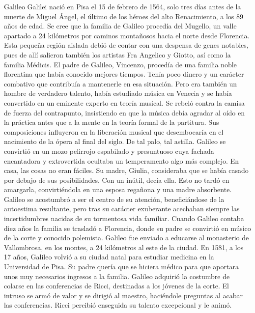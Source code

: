 \documentclass[letterpaper, 10pt, journal]{IEEEtran}
\begin{document}
Galileo Galilei nació en Pisa el 15 de febrero de 1564, solo tres días antes de la muerte de Miguel Ángel, el último de los héroes del alto Renacimiento, a los 89 años de edad. Se cree que la familia de Galileo procedía del Mugello, un valle apartado a 24 kilómetros por caminos montañosos hacia el norte desde Florencia. Esta pequeña región aislada debió de contar con una despensa de genes notables, pues de allí salieron también los artistas Fra Angelico y Giotto, así como la familia Médicis. \cite{[1]}
\newline
El padre de Galileo, Vincenzo, procedía de una familia noble florentina que había conocido mejores tiempos. Tenía poco dinero y un carácter combativo que contribuía a mantenerle en esa situación. Pero era también un hombre de verdadero talento, había estudiado música en Venecia y se había convertido en un eminente experto en teoría musical. Se rebeló contra la camisa de fuerza del contrapunto, insistiendo en que la música debía agradar al oído en la práctica antes que a la mente en la teoría formal de la partitura. Sus composiciones influyeron en la liberación musical que desembocaría en el nacimiento de la ópera al final del siglo. \cite{[2]}
\newline
De tal palo, tal astilla. Galileo se convirtió en un mozo pelirrojo espabilado y presuntuoso cuya fachada encantadora y extrovertida ocultaba un temperamento algo más complejo. En casa, las cosas no eran fáciles. Su madre, Giulia, consideraba que se había casado por debajo de sus posibilidades. Con un inútil, decía ella. Esto no tardó en amargarla, convirtiéndola en una esposa regañona y una madre absorbente. Galileo se acostumbró a ser el centro de su atención, beneficiándose de la autoestima resultante, pero tras su carácter exuberante acechaban siempre las incertidumbres nacidas de su tormentosa vida familiar. \cite{[2]}
\newline
Cuando Galileo contaba diez años la familia se trasladó a Florencia, donde su padre se convirtió en músico de la corte y conocido polemista. Galileo fue enviado a educarse al monasterio de Vallombrosa, en los montes, a 24 kilómetros al este de la ciudad. 
\newline
En 1581, a los 17 años, Galileo volvió a su ciudad natal para estudiar medicina en la Universidad de Pisa. Su padre quería que se hiciera médico para que aportara unos muy necesarios ingresos a la familia.
\newline
Galileo adquirió la costumbre de colarse en las conferencias de Ricci, destinadas a los jóvenes de la corte. El intruso se armó de valor y se dirigió al maestro, haciéndole preguntas al acabar las conferencias. Ricci percibió enseguida su talento excepcional y le animó.
\end{document}
